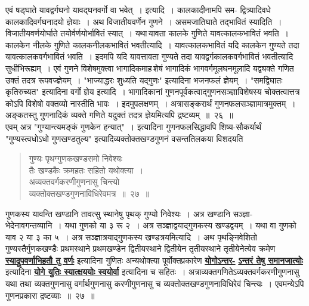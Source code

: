 \documentclass[11pt, openany]{book}
\begin{document}
\vspace{-4mm}
एवं षड्घाते यावद्वर्गघनो यावद्घनवर्गो वा भवेत्~। इत्यादि~। कालकादीनामपि सम- 
\newpage
\noindent द्वित्र्यादिवधे कालकादिवर्गघनादयो ज्ञेयाः~। अथ विजातीयवर्णेन गुणने~।
असमजातिघाते तद्भावितं स्यादिति~। विजातीयवर्णयोर्घाते
तयोर्वर्णयोर्भावितं स्यात्~।
यथा\textendash \,यावता कालके गुणिते यावत्कालकभावितं भवति~। कालकेन नीलके गुणिते
कालकनीलकभावितं भवतीत्यादि~। यावत्कालकभावितं यदि कालकेन गुण्यते तदा
यावत्कालकवर्गभावितं भवति~। इदमपि यदि यावत्तावता गुण्यते तदा
यावद्वर्गकालकवर्गभावितं भवतीत्यादि सुधीभिरूह्यम्~। एवं गुणने विशेषमुक्त्वा
भागादिकमाह\textendash \,शेषं भागादिकं भागवर्गमूलघनमूलादि यद्व्यक्ते गणित उक्तं तदत्र
रूपवज्ज्ञेयम्~। {\qt "भाज्याद्धरः शुध्यति यद्गुणः"} इत्यादिना भजनफलं ज्ञेयम्~। {\qt "समद्विघातः कृतिरुच्यत"} इत्यादिना वर्गो ज्ञेय इत्यादि~। भागादिकानां
गुणनपूर्वकत्वाद्गुणनसञ्ज्ञाविशेषस्य चोक्तत्वात्तत्र कोऽपि विशेषो वक्तव्यो नास्तीति भावः~।
इदमुपलक्षणम्~। अत्रासङ्करार्थं गुणनफलसञ्ज्ञामात्रमुक्तम्~। अङ्कतस्तु गुणनादिकं व्यक्ते
गणिते यदुक्तं तदत्र ज्ञेयमित्यपि द्रष्टव्यम्~॥~२६~॥\\

\vspace{-4mm}
एवम् अत्र {\qt "गुण्यान्त्यमङ्कं गुणकेन हन्यात्"}~। इत्यादिना गुणनफलसिद्धावपि
शिष्य-सौकर्यार्थं {\qt "गुण्यस्त्वधोऽधो गुणखण्डतुल्य"} इत्यादिव्यक्तोक्तखण्डगुणनं
वसन्ततिलकया विशदयति\textendash 

 \label{27}
\begin{quote}
    \ab
    गुण्यः पृथग्गुणकखण्डसमो निवेश्यः  \\
तैः खण्डकैः क्रमहतः सहितो यथोक्त्या~।\\
अव्यक्तवर्गकरणीगुणनासु चिन्त्यो\\
व्यक्तोक्तखण्डगुणनाविधिरेवमत्र~॥~२७~॥
\end{quote}

गुणकस्य यावन्ति खण्डानि तावत्सु स्थानेषु पृथक् गुण्यो निवेश्यः~। अत्र
खण्डानि सञ्ज्ञा-भेदेनावगन्तव्यानि~। यथा गुणको या ३ रू २~। अत्र सञ्ज्ञाद्वयाद्गुणकस्य खण्डद्वयम्~। 
यथा वा गुणको याव २ या ३ का ५~। अत्र सञ्ज्ञात्रयाद्गुणकस्य खण्डत्रयमित्यादि~। अथ पृथङ्निवेशितो 
गुण्यस्तैर्गुणकखण्डैः प्रथमस्थाने प्रथमखण्डेन द्वितीयस्थाने द्वितीयेन तृतीयस्थाने तृतीयेनेत्येव क्रमेण
\hyperref[26]{\textbf{स्याद्रूपवर्णाभिहतौ तु वर्णः}} इत्यादिना गुणितः अन्यथोक्त्या पूर्वोक्तप्रकारेण \hyperref[22]{\textbf{योगोऽन्तर-}}
 \newpage %
\noindent \hyperref[22]{\textbf{ऽन्तरं तेषु समानजात्योः}} इत्यादिना \hyperref[3]{\textbf{योगे युतिः स्यात्क्षययोः स्वयोर्वा}} 
इत्यादिना च सहितः~। अत्राव्यक्तगणितेऽव्यक्तवर्गकरणीगुणनासु यथा तथा व्यक्तगुणनासु
वर्गार्थगुणनासु करणीगुणनासु च व्यक्तोक्तखण्डगुणनाविधिरेवं चिन्त्यः~।
एवमन्येऽपि गुणनप्रकारा द्रष्टव्याः~॥~२७~॥\\
\end{document}
